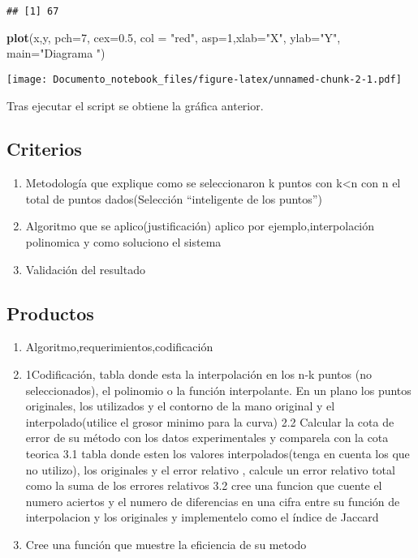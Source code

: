 \documentclass[]{article}
\newenvironment{Shaded}{\begin{snugshade}}{\end{snugshade}}
\newcommand{\KeywordTok}[1]{\textcolor[rgb]{0.13,0.29,0.53}{\textbf{#1}}}
\newcommand{\DataTypeTok}[1]{\textcolor[rgb]{0.13,0.29,0.53}{#1}}
\newcommand{\DecValTok}[1]{\textcolor[rgb]{0.00,0.00,0.81}{#1}}
\newcommand{\FloatTok}[1]{\textcolor[rgb]{0.00,0.00,0.81}{#1}}
\newcommand{\StringTok}[1]{\textcolor[rgb]{0.31,0.60,0.02}{#1}}
\newcommand{\NormalTok}[1]{#1}
\providecommand{\tightlist}{%
  \setlength{\itemsep}{0pt}\setlength{\parskip}{0pt}}
\begin{document}
\begin{verbatim}
## [1] 67
\end{verbatim}

\begin{Shaded}
\begin{Highlighting}[]
\KeywordTok{plot}\NormalTok{(x,y, }\DataTypeTok{pch=}\DecValTok{7}\NormalTok{, }\DataTypeTok{cex=}\FloatTok{0.5}\NormalTok{, }\DataTypeTok{col =} \StringTok{"red"}\NormalTok{, }\DataTypeTok{asp=}\DecValTok{1}\NormalTok{,}\DataTypeTok{xlab=}\StringTok{"X"}\NormalTok{, }\DataTypeTok{ylab=}\StringTok{"Y"}\NormalTok{, }\DataTypeTok{main=}\StringTok{"Diagrama "}\NormalTok{)}
\end{Highlighting}
\end{Shaded}

\texttt{[image: Documento\_notebook\_files/figure-latex/unnamed-chunk-2-1.pdf]}

Tras ejecutar el script se obtiene la gráfica anterior.

\subsection{Criterios}\label{criterios}

\begin{enumerate}
\def\labelenumi{\arabic{enumi}.}
\tightlist
\item
  Metodología que explique como se seleccionaron k puntos con
  k\textless{}n con n el total de puntos dados(Selección ``inteligente
  de los puntos'')
\item
  Algoritmo que se aplico(justificación) aplico por
  ejemplo,interpolación polinomica y como soluciono el sistema
\item
  Validación del resultado
\end{enumerate}

\subsection{Productos}\label{productos}

\begin{enumerate}
\def\labelenumi{\arabic{enumi}.}
\tightlist
\item
  Algoritmo,requerimientos,codificación
\item
  1Codificación, tabla donde esta la interpolación en los n-k puntos (no
  seleccionados), el polinomio o la función interpolante. En un plano
  los puntos originales, los utilizados y el contorno de la mano
  original y el interpolado(utilice el grosor minimo para la curva) 2.2
  Calcular la cota de error de su método con los datos experimentales y
  comparela con la cota teorica 3.1 tabla donde esten los valores
  interpolados(tenga en cuenta los que no utilizo), los originales y el
  error relativo , calcule un error relativo total como la suma de los
  errores relativos 3.2 cree una funcion que cuente el numero aciertos y
  el numero de diferencias en una cifra entre su función de
  interpolacion y los originales y implementelo como el índice de
  Jaccard
\item
  Cree una función que muestre la eficiencia de su metodo
\end{enumerate}
\end{document}
